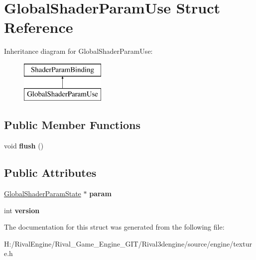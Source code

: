 \hypertarget{struct_global_shader_param_use}{}\section{Global\+Shader\+Param\+Use Struct Reference}
\label{struct_global_shader_param_use}
Inheritance diagram for Global\+Shader\+Param\+Use\+:\begin{figure}[H]
\begin{center}
\leavevmode
\includegraphics[height=2.000000cm]{struct_global_shader_param_use}
\end{center}
\end{figure}
\subsection*{Public Member Functions}
\begin{DoxyCompactItemize}
\item 
\mbox{\label{struct_global_shader_param_use_a317416a619ef3bd2dd887cff7f1d582d}} 
void {\bfseries flush} ()
\end{DoxyCompactItemize}
\subsection*{Public Attributes}
\begin{DoxyCompactItemize}
\item 
\mbox{\label{struct_global_shader_param_use_ac12e93cf9fcc5249bd258ab8e31bfbe0}} 
\hyperlink{struct_global_shader_param_state}{Global\+Shader\+Param\+State} $\ast$ {\bfseries param}
\item 
\mbox{\label{struct_global_shader_param_use_a1a99e43aceebfeb6038cdb3dd569a77b}} 
int {\bfseries version}
\end{DoxyCompactItemize}


The documentation for this struct was generated from the following file\+:\begin{DoxyCompactItemize}
\item 
H\+:/\+Rival\+Engine/\+Rival\+\_\+\+Game\+\_\+\+Engine\+\_\+\+G\+I\+T/\+Rival3dengine/source/engine/texture.\+h\end{DoxyCompactItemize}
